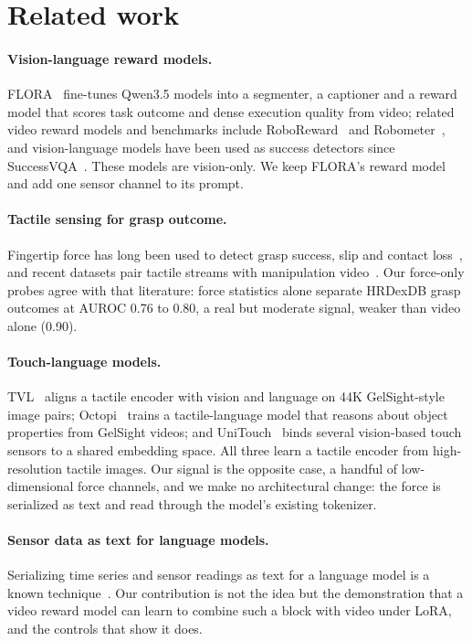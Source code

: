 \documentclass{article}
\begin{document}
\section{Related work}

\paragraph{Vision-language reward models.} FLORA~\cite{flora2026} fine-tunes Qwen3.5 models into
a segmenter, a captioner and a reward model that scores task outcome and dense execution quality
from video; related video reward models and benchmarks include RoboReward~\cite{lee2026roboreward} and
Robometer~\cite{liang2026robometer}, and vision-language models have been used as success
detectors since SuccessVQA~\cite{du2023successvqa}. These models are vision-only. We keep FLORA's reward model and add one
sensor channel to its prompt.

\paragraph{Tactile sensing for grasp outcome.} Fingertip force has long been used to detect
grasp success, slip and contact loss~\cite{veiga2015slip,yuan2017gelsight,calandra2017feeling},
and recent datasets pair tactile streams with manipulation video~\cite{hrdexdb2026}. Our
force-only probes agree with that literature: force statistics alone separate HRDexDB grasp
outcomes at AUROC 0.76 to 0.80, a real but moderate signal, weaker than video alone (0.90).

\paragraph{Touch-language models.} TVL~\cite{fu2024tvl} aligns a tactile encoder with
vision and language on 44K GelSight-style image pairs; Octopi~\cite{yu2024octopi} trains a
tactile-language model that reasons about object properties from GelSight videos; and
UniTouch~\cite{yang2024unitouch} binds several vision-based touch sensors to a shared embedding
space. All three learn a tactile encoder from high-resolution tactile images. Our signal is the
opposite case, a handful of low-dimensional force channels, and we make no architectural change:
the force is serialized as text and read through the model's existing tokenizer.

\paragraph{Sensor data as text for language models.} Serializing time series and sensor readings
as text for a language model is a known technique~\cite{gruver2023llmtime,jin2024timellm,xu2024penetrative}. Our contribution is not the idea but the demonstration that a video reward model can learn
to combine such a block with video under LoRA, and the controls that show it does.
\end{document}
